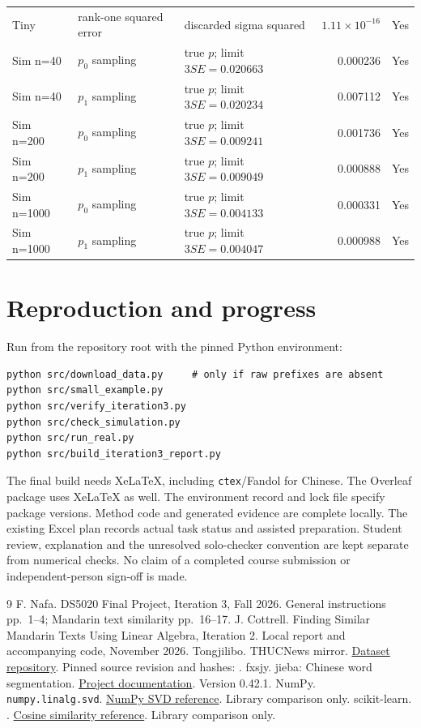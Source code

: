 \documentclass[11pt]{article}
\begin{document}
{\begin{longtable}{p{}p{}p{}rl}
Tiny & rank-one squared error & discarded sigma squared & $1.11\times10^{-16}$ & Yes \\
Sim n=40 & $p_{0}$ sampling & true $p$; limit $3SE=0.020663$ & 0.000236 & Yes \\
Sim n=40 & $p_{1}$ sampling & true $p$; limit $3SE=0.020234$ & 0.007112 & Yes \\
Sim n=200 & $p_{0}$ sampling & true $p$; limit $3SE=0.009241$ & 0.001736 & Yes \\
Sim n=200 & $p_{1}$ sampling & true $p$; limit $3SE=0.009049$ & 0.000888 & Yes \\
Sim n=1000 & $p_{0}$ sampling & true $p$; limit $3SE=0.004133$ & 0.000331 & Yes \\
Sim n=1000 & $p_{1}$ sampling & true $p$; limit $3SE=0.004047$ & 0.000988 & Yes \\
\bottomrule
\end{longtable}
}



\section{Reproduction and progress}
Run from the repository root with the pinned Python environment:
\begin{verbatim}
python src/download_data.py     # only if raw prefixes are absent
python src/small_example.py
python src/verify_iteration3.py
python src/check_simulation.py
python src/run_real.py
python src/build_iteration3_report.py
\end{verbatim}
The final build needs XeLaTeX, including \texttt{ctex}/Fandol for Chinese.
The Overleaf package uses XeLaTeX as well. The environment record and
lock file specify package versions.
Method code and generated evidence are complete locally. The existing
Excel plan records actual task status and assisted preparation.
Student review, explanation and the unresolved solo-checker convention
are kept separate from numerical checks. No claim of a completed
course submission or independent-person sign-off is made.

\begin{thebibliography}{9}
 F. Nafa. DS5020 Final Project, Iteration 3, Fall 2026.
General instructions pp.\ 1--4; Mandarin text similarity pp.\ 16--17.
 J. Cottrell. Finding Similar Mandarin Texts Using Linear
Algebra, Iteration 2. Local report and accompanying code, November 2026.
 Tongjilibo. THUCNews mirror.
\href{https://huggingface.co/datasets/Tongjilibo/THUCNews}{Dataset repository}.
Pinned source revision and hashes: .
 fxsjy. jieba: Chinese word segmentation.
\href{https://github.com/fxsjy/jieba}{Project documentation}. Version 0.42.1.
 NumPy. \texttt{numpy.linalg.svd}.
\href{https://numpy.org/doc/stable/reference/generated/numpy.linalg.svd.html}{NumPy SVD reference}.
Library comparison only.
 scikit-learn. .
\href{https://scikit-learn.org/stable/modules/generated/sklearn.metrics.pairwise.cosine_similarity.html}{Cosine similarity reference}.
Library comparison only.
\end{thebibliography}
\clearpage
\appendix
\end{document}
